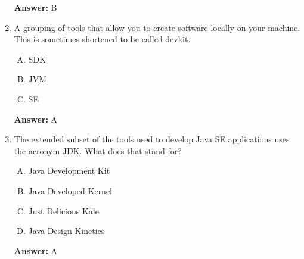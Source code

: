 \documentclass[12pt]{article}
\begin{document}
\begin{enumerate}[1.]
    \bigskip

    \textbf{Answer:} B

    \item

    A grouping of tools that allow you to create software locally on your machine.
    This is sometimes shortened to be called devkit.

    \bigskip

    \begin{enumerate}[A.]
        \item SDK
        \item JVM
        \item SE
    \end{enumerate}

    \bigskip

    \textbf{Answer:} A

    \item

    The extended subset of the tools used to develop Java SE applications uses
    the acronym JDK. What does that stand for?

    \bigskip

    \begin{enumerate}[A.]
        \item Java Development Kit
        \item Java Developed Kernel
        \item Just Delicious Kale
        \item Java Design Kinetics
    \end{enumerate}

    \bigskip

    \textbf{Answer:} A

\end{enumerate}
\end{document}
